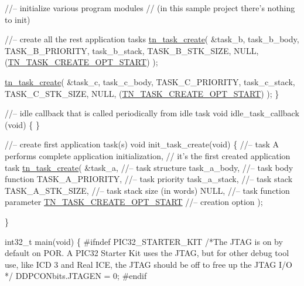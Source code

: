 \begin{DoxyCodeInclude}
   \textcolor{comment}{//-- initialize various program modules}
   \textcolor{comment}{//   (in this sample project there's nothing to init)}


   \textcolor{comment}{//-- create all the rest application tasks}
   \hyperlink{tn__tasks_8h_a548d5adda09d1b4e393b5df0e9e1a7a5}{tn\_task\_create}(
         &task\_b,
         task\_b\_body,
         TASK\_B\_PRIORITY,
         task\_b\_stack,
         TASK\_B\_STK\_SIZE,
         NULL,
         (\hyperlink{tn__tasks_8h_a8fa2ef577d6bd159b3fae559839f98d5a0c9352496e4465eb7e1b29dab7544acc}{TN\_TASK\_CREATE\_OPT\_START})
         );

   \hyperlink{tn__tasks_8h_a548d5adda09d1b4e393b5df0e9e1a7a5}{tn\_task\_create}(
         &task\_c,
         task\_c\_body,
         TASK\_C\_PRIORITY,
         task\_c\_stack,
         TASK\_C\_STK\_SIZE,
         NULL,
         (\hyperlink{tn__tasks_8h_a8fa2ef577d6bd159b3fae559839f98d5a0c9352496e4465eb7e1b29dab7544acc}{TN\_TASK\_CREATE\_OPT\_START})
         );
\}

\textcolor{comment}{//-- idle callback that is called periodically from idle task}
\textcolor{keywordtype}{void} idle\_task\_callback (\textcolor{keywordtype}{void})
\{
\}

\textcolor{comment}{//-- create first application task(s)}
\textcolor{keywordtype}{void} init\_task\_create(\textcolor{keywordtype}{void})
\{
   \textcolor{comment}{//-- task A performs complete application initialization,}
   \textcolor{comment}{//   it's the first created application task}
   \hyperlink{tn__tasks_8h_a548d5adda09d1b4e393b5df0e9e1a7a5}{tn\_task\_create}(
         &task\_a,                   \textcolor{comment}{//-- task structure}
         task\_a\_body,               \textcolor{comment}{//-- task body function}
         TASK\_A\_PRIORITY,           \textcolor{comment}{//-- task priority}
         task\_a\_stack,              \textcolor{comment}{//-- task stack}
         TASK\_A\_STK\_SIZE,           \textcolor{comment}{//-- task stack size (in words)}
         NULL,                      \textcolor{comment}{//-- task function parameter}
         \hyperlink{tn__tasks_8h_a8fa2ef577d6bd159b3fae559839f98d5a0c9352496e4465eb7e1b29dab7544acc}{TN\_TASK\_CREATE\_OPT\_START}   \textcolor{comment}{//-- creation option}
         );

\}

int32\_t main(\textcolor{keywordtype}{void})
\{
\textcolor{preprocessor}{#ifndef PIC32\_STARTER\_KIT}
   \textcolor{comment}{/*The JTAG is on by default on POR.  A PIC32 Starter Kit uses the JTAG, but}
\textcolor{comment}{     for other debug tool use, like ICD 3 and Real ICE, the JTAG should be off}
\textcolor{comment}{     to free up the JTAG I/O */}
   DDPCONbits.JTAGEN = 0;
\textcolor{preprocessor}{#endif}


\end{DoxyCodeInclude}
